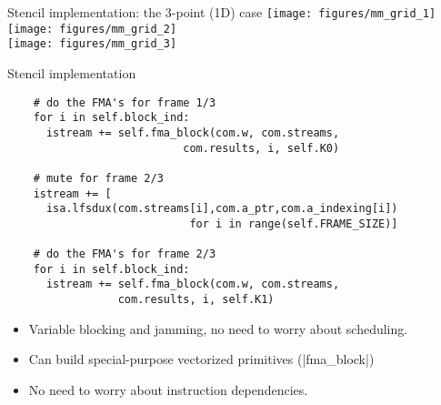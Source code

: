 \begin{frame}{Stencil implementation: the 3-point (1D) case}
  \texttt{[image: figures/mm\_grid\_1]} \\
  \texttt{[image: figures/mm\_grid\_2]} \\
  \texttt{[image: figures/mm\_grid\_3]}
\end{frame}

\begin{frame}[fragile,shrink=10]{Stencil implementation}
  \begin{verbatim}
    # do the FMA's for frame 1/3    
    for i in self.block_ind:
      istream += self.fma_block(com.w, com.streams,
                           com.results, i, self.K0)
    
    # mute for frame 2/3
    istream += [
      isa.lfsdux(com.streams[i],com.a_ptr,com.a_indexing[i])
                            for i in range(self.FRAME_SIZE)]

    # do the FMA's for frame 2/3    
    for i in self.block_ind:
      istream += self.fma_block(com.w, com.streams,
                 com.results, i, self.K1)
  \end{verbatim}
  \begin{itemize}
  \item Variable blocking and jamming, no need to worry about scheduling.
  \item Can build special-purpose vectorized primitives (\cverb|fma_block|)
  \item No need to worry about instruction dependencies.
  \end{itemize}
\end{frame}

